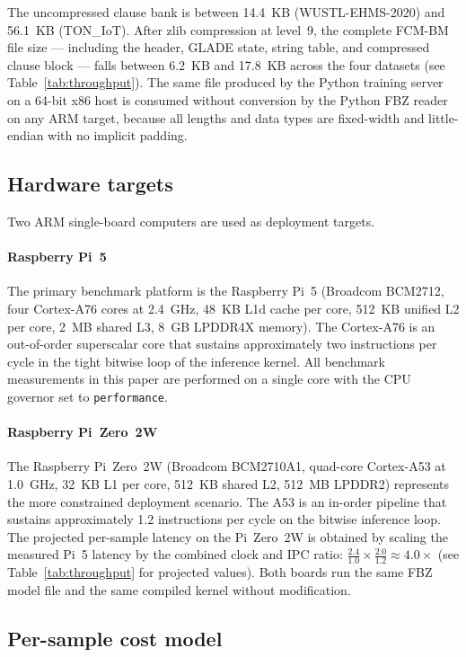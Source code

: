 \documentclass[journal,10pt]{IEEEtran}
\begin{document}
The uncompressed clause bank is between 14.4~KB (WUSTL-EHMS-2020)
and 56.1~KB (TON\_IoT). After zlib compression at level~9, the
complete FCM-BM file size --- including the header, GLADE state,
string table, and compressed clause block --- falls between 6.2~KB
and 17.8~KB across the four datasets (see
Table~\ref{tab:throughput}). The same file produced by the Python
training server on a 64-bit x86 host is consumed without conversion
by the Python FBZ reader on any ARM target, because all lengths and
data types are fixed-width and little-endian with no implicit
padding.

\subsection{Hardware targets}
\label{sec:hw-targets}

Two ARM single-board computers are used as deployment targets.

\paragraph{Raspberry Pi~5}
The primary benchmark platform is the Raspberry Pi~5 (Broadcom
BCM2712, four Cortex-A76 cores at 2.4~GHz, 48~KB L1d cache per core,
512~KB unified L2 per core, 2~MB shared L3, 8~GB LPDDR4X memory).
The Cortex-A76 is an out-of-order superscalar core that sustains
approximately two instructions per cycle in the tight bitwise loop
of the inference kernel. All benchmark measurements in this paper
are performed on a single core with the CPU governor set to
\texttt{performance}.

\paragraph{Raspberry Pi~Zero~2W}
The Raspberry Pi~Zero~2W (Broadcom BCM2710A1, quad-core Cortex-A53
at 1.0~GHz, 32~KB L1 per core, 512~KB shared L2, 512~MB LPDDR2)
represents the more constrained deployment scenario. The A53 is an
in-order pipeline that sustains approximately 1.2 instructions per
cycle on the bitwise inference loop. The projected per-sample latency on the Pi~Zero~2W is obtained by
scaling the measured Pi~5 latency by the combined clock and IPC ratio:
$\frac{2.4}{1.0} \times \frac{2.0}{1.2} \approx 4.0\times$ (see
Table~\ref{tab:throughput} for projected values). Both boards run the
same FBZ model file and the same compiled kernel without modification.

\subsection{Per-sample cost model}
\label{sec:hw-cost}
\end{document}
